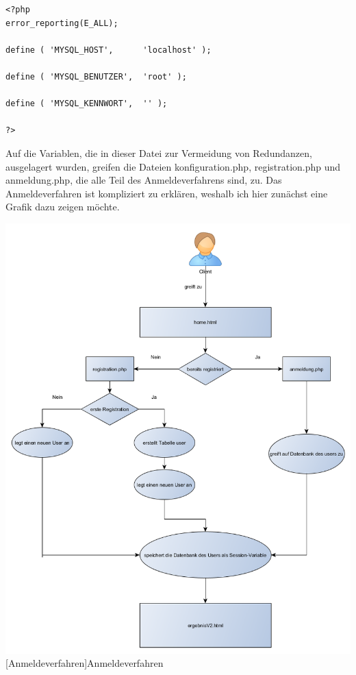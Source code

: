 \documentclass[12pt,a4paper,bibliography=totocnumbered,listof=totocnumbered]{scrartcl}
\begin{document}
\vspace{1em}
\begin{lstlisting}[caption= Ind.php, label=lst:ind.php]
<?php
error_reporting(E_ALL);
 
define ( 'MYSQL_HOST',      'localhost' );

define ( 'MYSQL_BENUTZER',  'root' );

define ( 'MYSQL_KENNWORT',  '' );

?>
\end{lstlisting}

Auf die Variablen, die in dieser Datei zur Vermeidung von Redundanzen, ausgelagert wurden, greifen die Dateien \glqq konfiguration.php\grqq, \glqq registration.php\grqq{} und \glqq anmeldung.php\grqq, die alle Teil des Anmeldeverfahrens sind, zu.
Das Anmeldeverfahren ist kompliziert zu erklären, weshalb ich hier zunächst eine Grafik dazu zeigen möchte.

\vspace{1em}
\begin{minipage}{\linewidth}
	\centering
	\includegraphics[width=1.0\linewidth]{Bilder/engine2-anmeldung.png}
	[Anmeldeverfahren]{Anmeldeverfahren}
	\label{fig:anmeldeverfahren}
\end{minipage}
\end{document}
